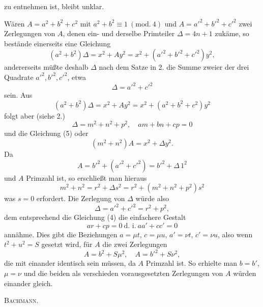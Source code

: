 zu entnehmen ist, bleibt unklar.
\par\noindent\hspace*{\parindent} Wären $A=a^2+b^2+c^2$ mit $a^2+b^2\equiv1\ (\mathrm{mod.}\ 4)$ und $A=a'^2+b'^2+c'^2$ zwei Zerlegungen
von $A$, denen ein- und derselbe Primteiler $\Delta=4n+1$ zukäme, so bestände einerseits eine Gleichung
\[
(a^2+b^2)\Delta=x^2+Ay^2=x^2+(a'^2+b'^2+c'^2)y^2,
\]
\noindent andererseits müßte deshalb $\Delta$ nach dem Satze in 2. die Summe zweier der drei Quadrate $a'^2,b'^2,c'^2$, etwa
\[
\Delta=a'^2+c'^2
\]
\noindent sein. Aus
\[
(a^2+b^2)\Delta=x^2+Ay^2=x^2+(a^2+b^2+c^2)y^2
\]
\clearpage
{}
\noindent folgt aber (siehe 2.)
\[
\Delta=m^2+n^2+p^2,\quad am+bn+cp=0
\]
\noindent und die Gleichung (5) oder
\[
(m^2+n^2)A=x^2+\Delta y^2.
\]
\noindent Da
\[
A=b'^2+(a'^2+c'^2)=b'^2+\Delta\,1^2
\]
\noindent und $A$ Primzahl ist, so erschließt man hieraus
\[
m^2+n^2=r^2+\Delta s^2=r^2+(m^2+n^2+p^2)s^2
\]
\noindent was $s=0$ erfordert. Die Zerlegung von $\Delta$ würde also
\[
\Delta=a'^2+c'^2=r^2+p^2,
\]
\noindent dem entsprechend die Gleichung (4) die einfachere Gestalt
\[
ar+cp=0\ \text{d. i.}\ aa'+cc'=0
\]
\noindent annähme. Dies gibt die Beziehungen $a=\mu t$, $c=\mu u$, $a'=\nu t$, $c'=\nu u$, also wenn $t^2+u^2=S$ gesetzt wird, für $A$ die zwei Zerlegungen
\[
A=b^2+S\mu^2,\quad A=b'^2+S\nu^2,
\]
\noindent die mit einander identisch sein müssen, da $A$ Primzahl ist. So erhielte man $b=b'$, $\mu=\nu$ und die beiden
als verschieden vorausgesetzten Zerlegungen von $A$ würden einander gleich.
\begin{flushright}\textsc{Bachmann.}\end{flushright}
\ClosingRule\clearpage\endgroup
